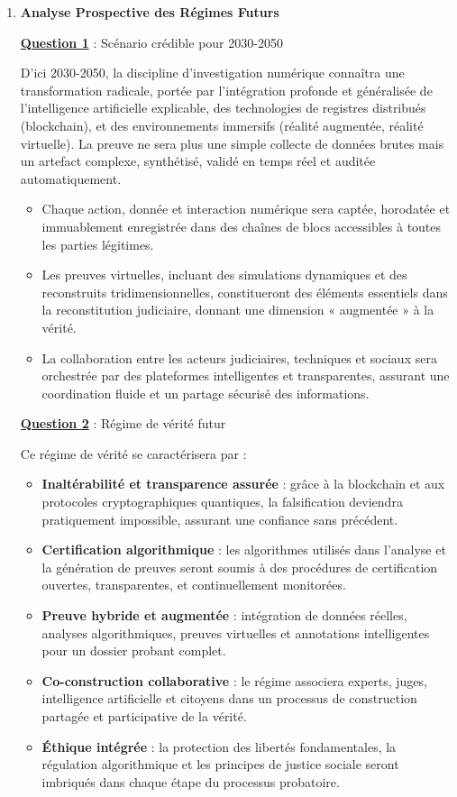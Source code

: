 \documentclass[12pt, a4paper]{article}
\newcommand{\question}[1]{\textbf{\underline{Question #1}}}
\begin{document}
\begin{enumerate}[label=\textbf{\arabic*.}, start=6]
		\item \textbf{Analyse Prospective des Régimes Futurs}
		
		\question{1} : Scénario crédible pour 2030-2050
		
		D'ici 2030-2050, la discipline d'investigation numérique connaîtra une transformation radicale, portée par l'intégration profonde et généralisée de l'intelligence artificielle explicable, des technologies de registres distribués (blockchain), et des environnements immersifs (réalité augmentée, réalité virtuelle). La preuve ne sera plus une simple collecte de données brutes mais un artefact complexe, synthétisé, validé en temps réel et auditée automatiquement.
		
		\begin{itemize}
			\item Chaque action, donnée et interaction numérique sera captée, horodatée et immuablement enregistrée dans des chaînes de blocs accessibles à toutes les parties légitimes.
			\item Les preuves virtuelles, incluant des simulations dynamiques et des reconstruits tridimensionnelles, constitueront des éléments essentiels dans la reconstitution judiciaire, donnant une dimension « augmentée » à la vérité.
			\item La collaboration entre les acteurs judiciaires, techniques et sociaux sera orchestrée par des plateformes intelligentes et transparentes, assurant une coordination fluide et un partage sécurisé des informations.
		\end{itemize}
		
		\question{2} : Régime de vérité futur
		
		Ce régime de vérité se caractérisera par :
		
		\begin{itemize}
			\item \textbf{Inaltérabilité et transparence assurée} : grâce à la blockchain et aux protocoles cryptographiques quantiques, la falsification deviendra pratiquement impossible, assurant une confiance sans précédent.
			\item \textbf{Certification algorithmique} : les algorithmes utilisés dans l'analyse et la génération de preuves seront soumis à des procédures de certification ouvertes, transparentes, et continuellement monitorées.
			\item \textbf{Preuve hybride et augmentée} : intégration de données réelles, analyses algorithmiques, preuves virtuelles et annotations intelligentes pour un dossier probant complet.
			\item \textbf{Co-construction collaborative} : le régime associera experts, juges, intelligence artificielle et citoyens dans un processus de construction partagée et participative de la vérité.
			\item \textbf{Éthique intégrée} : la protection des libertés fondamentales, la régulation algorithmique et les principes de justice sociale seront imbriqués dans chaque étape du processus probatoire.
		\end{itemize}
		

\end{enumerate}
\end{document}
